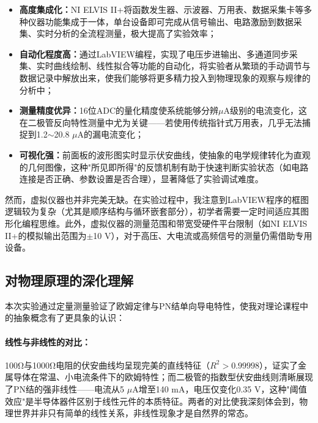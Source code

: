 \documentclass[11pt]{article}
\begin{document}
\begin{itemize}[leftmargin=2em,itemsep=2pt,parsep=0.5ex]
    \item \textbf{高度集成化：}NI ELVIS II+将函数发生器、示波器、万用表、数据采集卡等多种仪器功能集成于一体，单台设备即可完成从信号输出、电路激励到数据采集、实时分析的全流程测量，极大提高了实验效率；
    
    \item \textbf{自动化程度高：}通过LabVIEW编程，实现了电压步进输出、多通道同步采集、实时曲线绘制、线性拟合等功能的自动化，将实验者从繁琐的手动调节与数据记录中解放出来，使我们能够将更多精力投入到物理现象的观察与规律的分析中；
    
    \item \textbf{测量精度优异：}16位ADC的量化精度使系统能够分辨$\mu$A级别的电流变化，这在二极管反向特性测量中尤为关键——若使用传统指针式万用表，几乎无法捕捉到1.2$\sim$20.8 $\mu$A的漏电流变化；
    
    \item \textbf{可视化强：}前面板的波形图实时显示伏安曲线，使抽象的电学规律转化为直观的几何图像，这种"所见即所得"的反馈机制有助于快速判断实验状态（如电路连接是否正确、参数设置是否合理），显著降低了实验调试难度。
\end{itemize}

然而，虚拟仪器也并非完美无缺。在实验过程中，我注意到LabVIEW程序的框图逻辑较为复杂（尤其是顺序结构与循环嵌套部分），初学者需要一定时间适应其图形化编程思维。此外，虚拟仪器的测量范围和带宽受硬件平台限制（如NI ELVIS II+的模拟输出范围为$\pm$10 V），对于高压、大电流或高频信号的测量仍需借助专用设备。

\subsection{对物理原理的深化理解}

本次实验通过定量测量验证了欧姆定律与PN结单向导电特性，使我对理论课程中的抽象概念有了更具象的认识：

\paragraph{线性与非线性的对比：}100Ω与1000Ω电阻的伏安曲线均呈现完美的直线特征（$R^2 > 0.99998$），证实了金属导体在常温、小电流条件下的欧姆特性；而二极管的指数型伏安曲线则清晰展现了PN结的强非线性——电流从5 $\mu$A增至140 mA，电压仅变化0.35 V，这种"阈值效应"是半导体器件区别于线性元件的本质特征。两者的对比使我深刻体会到，物理世界并非只有简单的线性关系，非线性现象才是自然界的常态。
\end{document}
